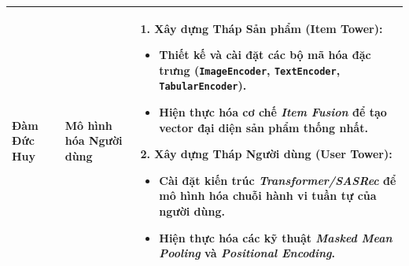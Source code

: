 \begin{table}[h!]
\begin{tabularx}{\textwidth}{@{} p{2.5cm} p{4cm} X @{}}
    \textbf{Đàm Đức Huy} 
    & Mô hình hóa Người dùng
    & 
    \textbf{1. Xây dựng Tháp Sản phẩm (Item Tower):}
    \begin{itemize}[leftmargin=*, nosep, after=\vspace{0.3em}]
        \item Thiết kế và cài đặt các bộ mã hóa đặc trưng (\texttt{ImageEncoder}, \texttt{TextEncoder}, \texttt{TabularEncoder}).
        \item Hiện thực hóa cơ chế \textit{Item Fusion} để tạo vector đại diện sản phẩm thống nhất.
    \end{itemize}
    \textbf{2. Xây dựng Tháp Người dùng (User Tower):}
    \begin{itemize}[leftmargin=*, nosep, after=\vspace{0.3em}]
        \item Cài đặt kiến trúc \textit{Transformer/SASRec} để mô hình hóa chuỗi hành vi tuần tự của người dùng.
        \item Hiện thực hóa các kỹ thuật \textit{Masked Mean Pooling} và \textit{Positional Encoding}.
    \end{itemize}
    \\ \bottomrule
    \end{tabularx}
\end{table}


